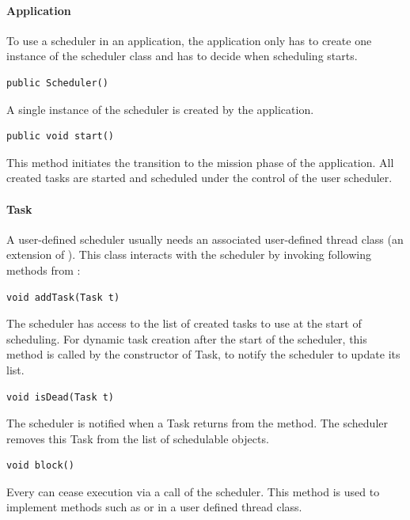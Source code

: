 \paragraph{Application}

To use a scheduler in an application, the application only has to
create one instance of the scheduler class and has to decide when
scheduling starts.

\begin{lstlisting}[emph=Scheduler]
public Scheduler()
\end{lstlisting}
A single instance of the scheduler is created by the application.

\begin{lstlisting}[emph=start]
public void start()
\end{lstlisting}
This method initiates the transition to the mission phase of the
application. All created tasks are started and scheduled under the
control of the user scheduler.

\paragraph{Task}

A user-defined scheduler usually needs an associated user-defined
thread class (an extension of ). This class interacts
with the scheduler by invoking following methods from
:

\begin{lstlisting}[emph=addTask]
void addTask(Task t)
\end{lstlisting}
The scheduler has access to the list of created tasks to use at the
start of scheduling. For dynamic task creation after the start of
the scheduler, this method is called by the constructor of Task, to
notify the scheduler to update its list.

\begin{lstlisting}[emph=isDead]
void isDead(Task t)
\end{lstlisting}
The scheduler is notified when a Task returns from the 
method. The scheduler removes this Task from the list of schedulable
objects.

\begin{lstlisting}[emph=block]
void block()
\end{lstlisting}
Every  can cease execution via a call of the scheduler.
This method is used to implement methods such as
 or  in a user defined
thread class.

